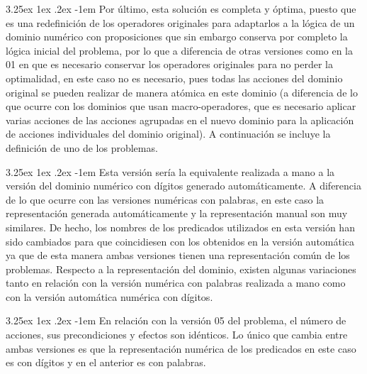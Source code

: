 \documentclass{article}
\makeatletter
\newcounter{subsubsubsection}
\renewcommand\paragraph{\@startsection{paragraph}{5}{\z@}%
      {3.25ex \@plus1ex \@minus.2ex}%
      {-1em}%
      {\normalfont\normalsize\bfseries}}
\makeatother
\begin{document}
    \paragraph{}
    Por último, esta solución es completa y óptima, puesto que es una redefinición de los operadores originales para adaptarlos a la lógica de un dominio numérico con proposiciones que sin embargo conserva por completo la lógica inicial del problema, por lo que a diferencia de otras versiones como en la 01 en que es necesario conservar los operadores originales para no perder la optimalidad, en este caso no es necesario, pues todas las acciones del dominio original se pueden realizar de manera atómica en este dominio (a diferencia de lo que ocurre con los dominios que usan macro-operadores, que es necesario aplicar varias acciones de las acciones agrupadas en el nuevo dominio para la aplicación de acciones individuales del dominio original). A continuación se incluye la definición de uno de los problemas.
    
    \paragraph{}
    Esta versión sería la equivalente realizada a mano a la versión del dominio numérico con dígitos generado automáticamente. A diferencia de lo que ocurre con las versiones numéricas con palabras, en este caso la representación generada automáticamente y la representación manual son muy similares. De hecho, los nombres de los predicados utilizados en esta versión han sido cambiados para que coincidiesen con los obtenidos en la versión automática ya que de esta manera ambas versiones tienen una representación común de los problemas. Respecto a la representación del dominio, existen algunas variaciones tanto en relación con la versión numérica con palabras realizada a mano como con la versión automática numérica con dígitos.
    
    \paragraph{}
    En relación con la versión 05 del problema, el número de acciones, sus precondiciones y efectos son idénticos. Lo único que cambia entre ambas versiones es que la representación numérica de los predicados en este caso es con dígitos y en el anterior es con palabras.
    
\end{document}
